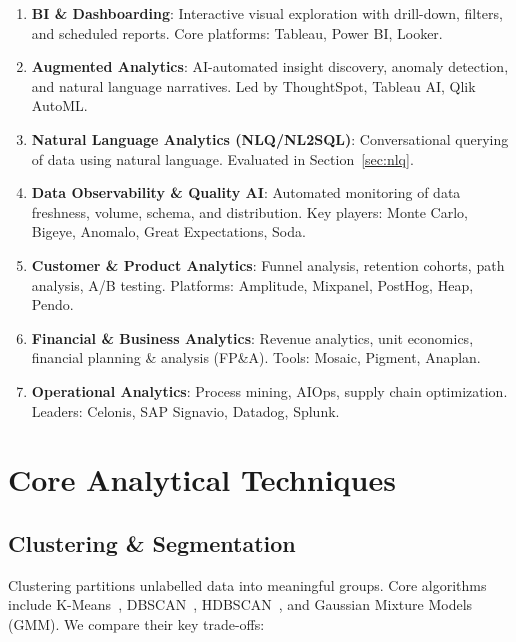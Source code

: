 \documentclass[12pt, a4paper]{article}
\begin{document}
\begin{enumerate}
    \item \textbf{BI \& Dashboarding}: Interactive visual exploration with drill-down, filters, and scheduled reports. Core platforms: Tableau, Power BI, Looker.
    \item \textbf{Augmented Analytics}: AI-automated insight discovery, anomaly detection, and natural language narratives. Led by ThoughtSpot, Tableau AI, Qlik AutoML.
    \item \textbf{Natural Language Analytics (NLQ/NL2SQL)}: Conversational querying of data using natural language. Evaluated in Section~\ref{sec:nlq}.
    \item \textbf{Data Observability \& Quality AI}: Automated monitoring of data freshness, volume, schema, and distribution. Key players: Monte Carlo, Bigeye, Anomalo, Great Expectations, Soda.
    \item \textbf{Customer \& Product Analytics}: Funnel analysis, retention cohorts, path analysis, A/B testing. Platforms: Amplitude, Mixpanel, PostHog, Heap, Pendo.
    \item \textbf{Financial \& Business Analytics}: Revenue analytics, unit economics, financial planning \& analysis (FP\&A). Tools: Mosaic, Pigment, Anaplan.
    \item \textbf{Operational Analytics}: Process mining, AIOps, supply chain optimization. Leaders: Celonis, SAP Signavio, Datadog, Splunk.
\end{enumerate}

\section{Core Analytical Techniques}\label{sec:techniques}

\subsection{Clustering \& Segmentation}
Clustering partitions unlabelled data into meaningful groups. Core algorithms include K-Means~\citep{lloyd1982kmeans}, DBSCAN~\citep{ester1996dbscan}, HDBSCAN~\citep{mcinnes2017hdbscan}, and Gaussian Mixture Models (GMM). We compare their key trade-offs:
\end{document}
